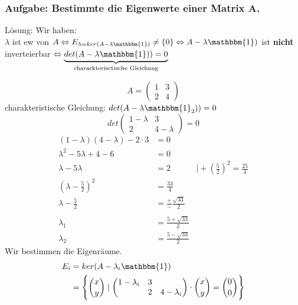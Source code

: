 \documentclass[9pt]{article} %
\begin{document}
   \subsubsection{Aufgabe: Bestimmte die Eigenwerte einer Matrix A.}
   Lösung: Wir haben: \\
   $\lambda$ ist \gls{ew} von $A \Leftrightarrow E_{\lambda = ker(A - \lambda \mathbbm{1})}\neq \{0\} \Leftrightarrow A - \lambda \mathbbm{1})$ ist \textbf{nicht} inverteierbar $\Leftrightarrow \underbrace{det(A - \lambda \mathbbm{1})) = 0}_{\text{charackterisctische Gleichung}}$
   \begin{bsp}
    \[
    A = \begin{pmatrix}
    1 & 3 \\ 2 & 4
    \end{pmatrix}
    \]
    charakteristische Gleichung: $det(A - \lambda \mathbbm{1}_2)) = 0$ 
    \[
    det \begin{pmatrix}
    1 - \lambda & 3 \\ 2 & 4 - \lambda
    \end{pmatrix} = 0
    \]
    \begin{align*}
        (1-\lambda)(4-\lambda) - 2\cdot 3  & = 0 \\
        \lambda^2 - 5 \lambda + 4 -6 & = 0 \\
        \lambda - 5 \lambda & = 2  & \mid + (\frac{5}{2})^2 = \frac{25}{4}\\
        (\lambda - \frac{5}{2})^2 & = \frac{
        33}{4} \\
        \lambda - \frac{5}{2} & = \frac{+}{-} \frac{\sqrt{33}}{2} \\ \\
        \lambda_1
 & = \frac{5 + \sqrt{33}}{2} \\
 \lambda_2  & = \frac{5 - \sqrt{33}}{2}
\end{align*} 
 Wir bestimmen die Eigenräume. 
 \begin{align*}
     E_i & = ker(A - \lambda_i \mathbbm{1}) \\
     & = \Biggl\{
     \binom{x}{y} \mid \begin{pmatrix}
     1 - \lambda_i & 3 \\ & 2 & 4 - \lambda_i
     \end{pmatrix} \cdot  
     \binom{x}{y} = \binom{0}{0} 
     \Biggr\}
 \end{align*}
 \begin{align*}

\end{align*}
\end{bsp}
\end{document}
